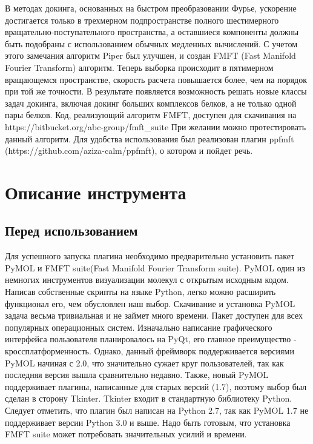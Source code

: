 \documentclass[a4paper,12pt]{article}
\numberwithin{equation}{section}%
\begin{document}
\newline
В методах докинга, основанных на быстром преобразовании Фурье, ускорение достигается только в трехмерном подпространстве полного шестимерного вращательно-поступательного пространства, а оставшиеся компоненты должны быть подобраны с использованием обычных медленных вычислений. С учетом этого замечания алгоритм Piper был улучшен, и создан FMFT (Fast Manifold Fourier Transform) алгоритм\cite{s11}. Теперь выборка происходит в пятимерном вращающемся пространстве, скорость расчета повышается более, чем на порядок при той же точности. В результате появляется возможность решать новые классы задач докинга, включая докинг больших комплексов белков, а не только одной пары белков.
\newline
Код, реализующий алгоритм FMFT, доступен для скачивания на https://bitbucket.org/abc-group/fmft\_suite
\newline
При желании можно протестировать данный алгоритм. Для удобства использования был реализован плагин ppfmft (https://github.com/aziza-calm/ppfmft), о котором и пойдет речь.
\newpage
\section{Описание инструмента}
\subsection{Перед использованием}
Для успешного запуска плагина необходимо предварительно установить пакет PyMOL\cite{s12} и FMFT suite(Fast Manifold Fourier Transform suite)\cite{s11}.
\newline
PyMOL один из немногих инструментов визуализации молекул с открытым исходным кодом. Написав собственные скрипты на языке Python, легко можно расширить функционал его, чем обусловлен наш выбор.
\newline
Скачивание и установка PyMOL задача весьма тривиальная и не займет много времени. Пакет доступен для всех популярных операционных систем.
\newline
Изначально написание графического интерфейса пользователя планировалось на PyQt, его главное преимущество - кроссплатформенность. Однако, данный фреймворк поддерживается версиями PyMOL начиная с 2.0, что значительно сужает круг пользователей, так как последняя версия вышла сравнительно недавно. Также, новый PyMOL поддерживает плагины, написанные для старых версий (1.7), поэтому выбор был сделан в сторону Tkinter.
\newline
Tkinter входит в стандартную библиотеку Python. Следует отметить, что плагин был написан на Python 2.7, так как PyMOL 1.7 не поддерживает версии Python 3.0 и выше.
\newline
Надо быть готовым, что установка FMFT suite может потребовать значительных усилий и времени.
\newpage
\end{document}

